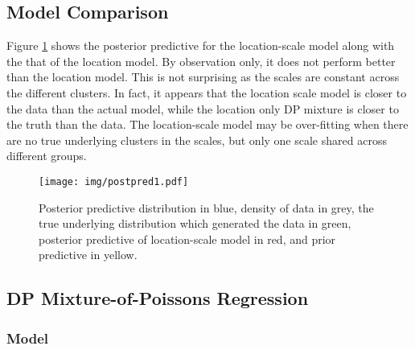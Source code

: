\documentclass{article}
\def\beginmyfig{\begin{figure}[h]\center}
\def\endmyfig{\end{figure}}
\begin{document}
\subsection{Model Comparison}
Figure \ref{fig:postpred1} shows the posterior predictive for the location-scale model
along with the that of the location model. By observation only, it does not perform better
than the location model. This is not surprising as the scales are constant across the different 
clusters. In fact, it appears that the location scale model is closer to the data than the 
actual model, while the location only DP mixture is closer to the truth than the data. The 
location-scale model may be over-fitting when there are no true underlying clusters in the
scales, but only one scale shared across different groups.
\beginmyfig
  \texttt{[image: img/postpred1.pdf]}
  \caption{Posterior predictive distribution in blue, density of data in grey, the true
  underlying distribution which generated the data in green, posterior predictive of
  location-scale model in red, and prior predictive in yellow.}
  \label{fig:postpred1}
\endmyfig

\subsection{DP Mixture-of-Poissons Regression}
\subsubsection{Model}
\end{document}
